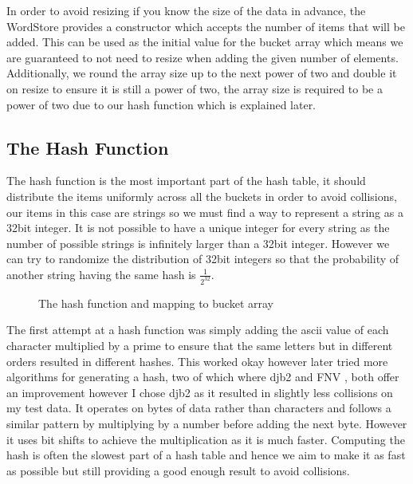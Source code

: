 \documentclass[12pt]{article}
\begin{document}
In order to avoid resizing if you know the size of the data in advance, the WordStore provides a constructor which accepts the number of items that will be added. This can be used as the initial value for the bucket array which means we are guaranteed to not need to resize when adding the given number of elements. Additionally, we round the array size up to the next power of two and double it on resize to ensure it is still a power of two, the array size is required to be a power of two due to our hash function which is explained later.

\subsection{The Hash Function}
The hash function is the most important part of the hash table, it should distribute the items uniformly across all the buckets in order to avoid collisions, our items in this case are strings so we must find a way to represent a string as a 32bit integer. It is not possible to have a unique integer for every string as the number of possible strings is infinitely larger than a 32bit integer. However we can try to randomize the distribution of 32bit integers so that the probability of another string having the same hash is $\frac{1}{2^{32}}$.

\begin{figure}[!htp]
\centering
{}
\caption{The hash function and mapping to bucket array}
\label{lst:hash_function}
\end{figure}

The first attempt at a hash function was simply adding the ascii value of each character multiplied by a prime to ensure that the same letters but in different orders resulted in different hashes. This worked okay however later tried more algorithms for generating a hash, two of which where djb2 \cite{hashfunctionsdjb2} and FNV \cite{hashfunctionsfnv}, both offer an improvement however I chose djb2 as it resulted in slightly less collisions on my test data. It operates on bytes of data rather than characters and follows a similar pattern by multiplying by a number before adding the next byte. However it uses bit shifts to achieve the multiplication as it is much faster. Computing the hash is often the slowest part of a hash table and hence we aim to make it as fast as possible but still providing a good enough result to avoid collisions.
\end{document}
